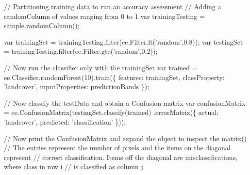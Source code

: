 \documentclass[]{article}
\newenvironment{Shaded}{}{}
\newcommand{\AttributeTok}[1]{#1}
\newcommand{\CommentTok}[1]{\textcolor[rgb]{0.00,0.50,0.00}{#1}}
\newcommand{\DataTypeTok}[1]{#1}
\newcommand{\DecValTok}[1]{#1}
\newcommand{\FloatTok}[1]{#1}
\newcommand{\KeywordTok}[1]{\textcolor[rgb]{0.00,0.00,1.00}{#1}}
\newcommand{\NormalTok}[1]{#1}
\newcommand{\OperatorTok}[1]{#1}
\newcommand{\StringTok}[1]{\textcolor[rgb]{0.00,0.50,0.50}{#1}}
\newcommand{\VariableTok}[1]{#1}
\begin{document}
\begin{Shaded}
\begin{Highlighting}[numbers=left,,]
\CommentTok{// Partitioning training data to run an accuracy assessment}
\CommentTok{// Adding a randomColumn of values ranging from 0 to 1}
\KeywordTok{var}\NormalTok{ trainingTesting }\OperatorTok{=} \VariableTok{sample}\NormalTok{.}\AttributeTok{randomColumn}\NormalTok{()}\OperatorTok{;}

\KeywordTok{var}\NormalTok{ trainingSet }\OperatorTok{=} \VariableTok{trainingTesting}\NormalTok{.}\AttributeTok{filter}\NormalTok{(}\VariableTok{ee}\NormalTok{.}\VariableTok{Filter}\NormalTok{.}\AttributeTok{lt}\NormalTok{(}\StringTok{'random'}\OperatorTok{,}\FloatTok{0.8}\NormalTok{))}\OperatorTok{;}
\KeywordTok{var}\NormalTok{ testingSet }\OperatorTok{=} \VariableTok{trainingTesting}\NormalTok{.}\AttributeTok{filter}\NormalTok{(}\VariableTok{ee}\NormalTok{.}\VariableTok{Filter}\NormalTok{.}\AttributeTok{gte}\NormalTok{(}\StringTok{'random'}\OperatorTok{,}\FloatTok{0.2}\NormalTok{))}\OperatorTok{;}

\CommentTok{// Now run the classifier only with the trainingSet}
\KeywordTok{var}\NormalTok{ trained }\OperatorTok{=} \VariableTok{ee}\NormalTok{.}\VariableTok{Classifier}\NormalTok{.}\AttributeTok{randomForest}\NormalTok{(}\DecValTok{10}\NormalTok{).}\AttributeTok{train}\NormalTok{(}\OperatorTok{\{}
  \DataTypeTok{features}\OperatorTok{:}\NormalTok{ trainingSet}\OperatorTok{,}
  \DataTypeTok{classProperty}\OperatorTok{:} \StringTok{'landcover'}\OperatorTok{,}
  \DataTypeTok{inputProperties}\OperatorTok{:}\NormalTok{ predictionBands}
\OperatorTok{\}}\NormalTok{)}\OperatorTok{;}

\CommentTok{// Now classify the testData and obtain a Confusion matrix}
\KeywordTok{var}\NormalTok{ confusionMatrix }\OperatorTok{=} \VariableTok{ee}\NormalTok{.}\AttributeTok{ConfusionMatrix}\NormalTok{(}\VariableTok{testingSet}\NormalTok{.}\AttributeTok{classify}\NormalTok{(trained)}
\NormalTok{                                                  .}\AttributeTok{errorMatrix}\NormalTok{(}\OperatorTok{\{}
                                                    \DataTypeTok{actual}\OperatorTok{:} \StringTok{'landcover'}\OperatorTok{,}
                                                    \DataTypeTok{predicted}\OperatorTok{:} \StringTok{'classification'}
                                                  \OperatorTok{\}}\NormalTok{))}\OperatorTok{;}

\CommentTok{// Now print the ConfusionMatrix and expand the object to inspect the matrix()}
\CommentTok{// The entries represent the number of pixels and the items on the diagonal represent}
\CommentTok{// correct classification. Items off the diagonal are misclassifications, where class in row i}
\CommentTok{// is classified as column j}


\end{Highlighting}
\end{Shaded}
\end{document}
